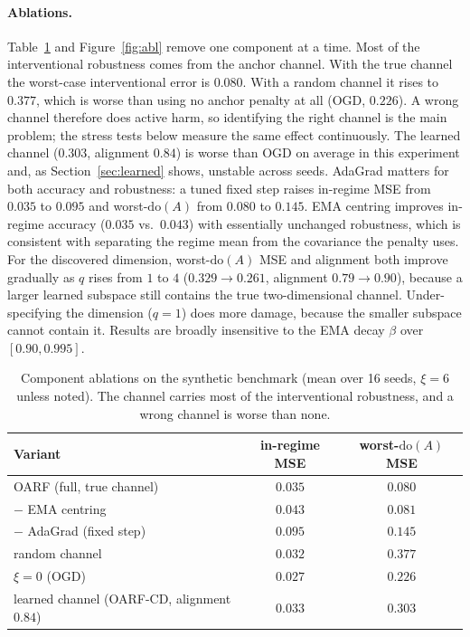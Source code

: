\documentclass[12pt]{article}
\theoremstyle{plain}
\theoremstyle{remark}
\newcommand{\doop}{\mathrm{do}}
\newcommand{\OARF}{\textsc{OARF}}
\newcommand{\OARFCD}{\textsc{OARF-CD}}
\begin{document}
\paragraph{Ablations.}
Table~\ref{tab:abl} and Figure~\ref{fig:abl} remove one component at a time. Most of the
interventional robustness comes from the anchor channel. With the true channel the
worst-case interventional error is $0.080$. With a random channel it rises to $0.377$,
which is worse than using no anchor penalty at all (OGD, $0.226$). A wrong channel
therefore does active harm, so identifying the right channel is the main problem; the
stress tests below measure the same effect continuously. The learned channel ($0.303$, alignment $0.84$) is worse than OGD on average in this experiment and, as Section~\ref{sec:learned}
shows, unstable across seeds. AdaGrad matters for both accuracy and robustness: a tuned
fixed step raises in-regime MSE from $0.035$ to $0.095$ and worst-$\doop(A)$ from $0.080$
to $0.145$. EMA centring improves in-regime accuracy ($0.035$ vs.\ $0.043$) with
essentially unchanged robustness, which is consistent with separating the regime mean from
the covariance the penalty uses. For the discovered dimension, worst-$\doop(A)$ MSE and
alignment both improve gradually as $q$ rises from $1$ to $4$ ($0.329\!\to\!0.261$,
alignment $0.79\!\to\!0.90$), because a larger learned subspace still contains the true
two-dimensional channel. Under-specifying the dimension ($q=1$) does more damage, because
the smaller subspace cannot contain it. Results are broadly insensitive to the EMA decay
$\beta$ over $[0.90,0.995]$.

\begin{table}[htbp]
\centering
\caption{Component ablations on the synthetic benchmark (mean over 16 seeds, $\xi=6$
unless noted). The channel carries most of the interventional robustness, and a wrong
channel is worse than none.}
\label{tab:abl}
\small
\begin{tabular}{lcc}
\toprule
Variant & in-regime MSE & worst-$\doop(A)$ MSE\\
\midrule
\OARF{} (full, true channel) & $0.035$ & $\mathbf{0.080}$\\
\quad $-$ EMA centring        & $0.043$ & $0.081$\\
\quad $-$ AdaGrad (fixed step) & $0.095$ & $0.145$\\
\quad random channel          & $0.032$ & $0.377$\\
\quad $\xi=0$ (OGD)           & $0.027$ & $0.226$\\
\midrule
learned channel (\OARFCD{}, alignment $0.84$) & $0.033$ & $0.303$\\
\bottomrule
\end{tabular}
\end{table}
\end{document}
